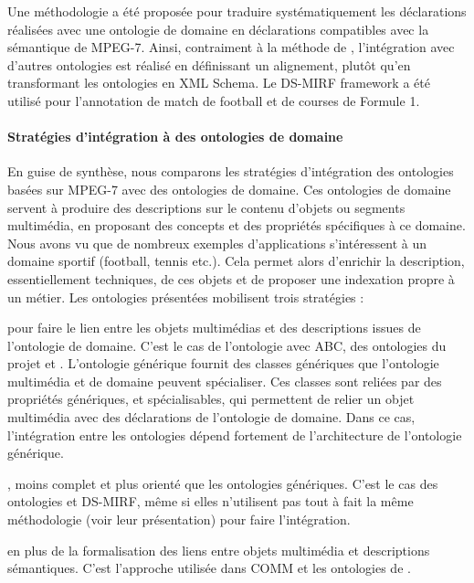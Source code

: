 Une méthodologie a été proposée pour traduire systématiquement les déclarations réalisées avec une ontologie de domaine en déclarations compatibles avec la sémantique de MPEG-7.
Ainsi, contraiment à la méthode de , l'intégration avec d'autres ontologies est réalisé en définissant un alignement, plutôt qu'en transformant les ontologies en XML Schema.
Le DS-MIRF framework a été utilisé pour l'annotation de match de football et de courses de Formule 1.


\paragraph{Stratégies d'intégration à des ontologies de domaine}
En guise de synthèse, nous comparons les stratégies d'intégration des ontologies basées sur MPEG-7 avec des ontologies de domaine.
Ces ontologies de domaine servent à produire des descriptions sur le contenu d'objets ou segments multimédia, en proposant des concepts et des propriétés spécifiques à ce domaine. 
Nous avons vu que de nombreux exemples d'applications s'intéressent à un domaine sportif (football, tennis etc.).
Cela permet alors d'enrichir la description, essentiellement techniques, de ces objets et de proposer une indexation propre à un métier.
Les ontologies présentées mobilisent trois stratégies : 
\begin{liste}
	\item {} pour faire le lien entre les objets multimédias et des descriptions issues de l'ontologie de domaine. 
	C'est le cas de l'ontologie  avec ABC, des ontologies du projet  et .
	L'ontologie générique fournit des classes génériques que l'ontologie multimédia et de domaine peuvent spécialiser. 
	Ces classes sont reliées par des propriétés génériques, et spécialisables, qui permettent de relier un objet multimédia avec des déclarations de l'ontologie de domaine.
	Dans ce cas, l'intégration entre les ontologies dépend fortement de l'architecture de l'ontologie générique.

	\item {}, moins complet et plus orienté que les ontologies génériques.
	C'est le cas des ontologies  et DS-MIRF, même si elles n'utilisent pas tout à fait la même méthodologie (voir leur présentation) pour faire l'intégration.

	\item {} en plus de la formalisation des liens entre objets multimédia et descriptions sémantiques. 
	C'est l'approche utilisée dans COMM et les ontologies de .
\end{liste}

